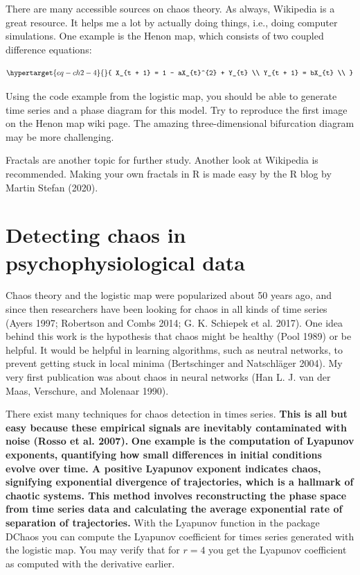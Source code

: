 \documentclass[
  letterpaper,
]{scrbook}
\begin{document}
There are many accessible sources on chaos theory. As always, Wikipedia
is a great resource. It helps me a lot by actually doing things, i.e.,
doing computer simulations. One example is the Henon map, which consists
of two coupled difference equations:

\begin{equation}\protect\hypertarget{eq-ch2-4}{}{
X_{t + 1} = 1 - aX_{t}^{2} + Y_{t} \\
Y_{t + 1} = bX_{t} \\
}\label{eq-ch2-4}\end{equation}

Using the code example from the logistic map, you should be able to
generate time series and a phase diagram for this model. Try to
reproduce the first image on the Henon map wiki page. The amazing
three-dimensional bifurcation diagram may be more challenging.

Fractals are another topic for further study. Another look at Wikipedia
is recommended. Making your own fractals in R is made easy by the R blog
by Martin Stefan (2020).

\hypertarget{detecting-chaos-in-psychophysiological-data}{%
\section{Detecting chaos in psychophysiological
data}\label{detecting-chaos-in-psychophysiological-data}}

Chaos theory and the logistic map were popularized about 50 years ago,
and since then researchers have been looking for chaos in all kinds of
time series (Ayers 1997; Robertson and Combs 2014; G. K. Schiepek et al.
2017). One idea behind this work is the hypothesis that chaos might be
healthy (Pool 1989) or be helpful. It would be helpful in learning
algorithms, such as neutral networks, to prevent getting stuck in local
minima (Bertschinger and Natschläger 2004). My very first publication
was about chaos in neural networks (Han L. J. van der Maas, Verschure,
and Molenaar 1990).

There exist many techniques for chaos detection in times series.
\textbf{This is all but easy because these empirical signals are
inevitably contaminated with noise (Rosso et al. 2007).} \textbf{One
example is the computation of Lyapunov exponents, quantifying how small
differences in initial conditions evolve over time. A positive Lyapunov
exponent indicates chaos, signifying exponential divergence of
trajectories, which is a hallmark of chaotic systems. This method
involves reconstructing the phase space from time series data and
calculating the average exponential rate of separation of trajectories.}
With the Lyapunov function in the package DChaos you can compute the
Lyapunov coefficient for times series generated with the logistic map.
You may verify that for \(r = 4\) you get the Lyapunov coefficient as
computed with the derivative earlier.
\end{document}

